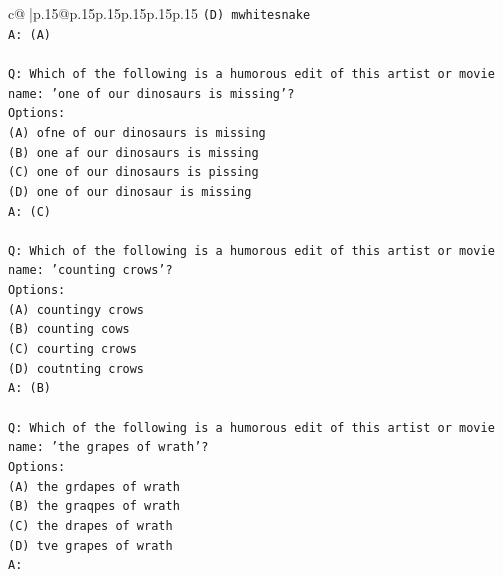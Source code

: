 \documentclass{article}
\begin{document}
{\begin{supertabular}{c@{$\;$}|p{.15\linewidth}@{}p{.15\linewidth}p{.15\linewidth}p{.15\linewidth}p{.15\linewidth}p{.15\linewidth}}
{{{\texttt{(D) mwhitesnake} \\
\texttt{A: (A)} \\
\\ 
\texttt{Q: Which of the following is a humorous edit of this artist or movie name: 'one of our dinosaurs is missing'?} \\
\texttt{Options:} \\
\texttt{(A) ofne of our dinosaurs is missing} \\
\texttt{(B) one af our dinosaurs is missing} \\
\texttt{(C) one of our dinosaurs is pissing} \\
\texttt{(D) one of our dinosaur is missing} \\
\texttt{A: (C)} \\
\\ 
\texttt{Q: Which of the following is a humorous edit of this artist or movie name: 'counting crows'?} \\
\texttt{Options:} \\
\texttt{(A) countingy crows} \\
\texttt{(B) counting cows} \\
\texttt{(C) courting crows} \\
\texttt{(D) coutnting crows} \\
\texttt{A: (B)} \\
\\ 
\texttt{Q: Which of the following is a humorous edit of this artist or movie name: 'the grapes of wrath'?} \\
\texttt{Options:} \\
\texttt{(A) the grdapes of wrath} \\
\texttt{(B) the graqpes of wrath} \\
\texttt{(C) the drapes of wrath} \\
\texttt{(D) tve grapes of wrath} \\
\texttt{A:} \\
            }
        }
    }
     \\ \\


\end{supertabular}}
\end{document}
